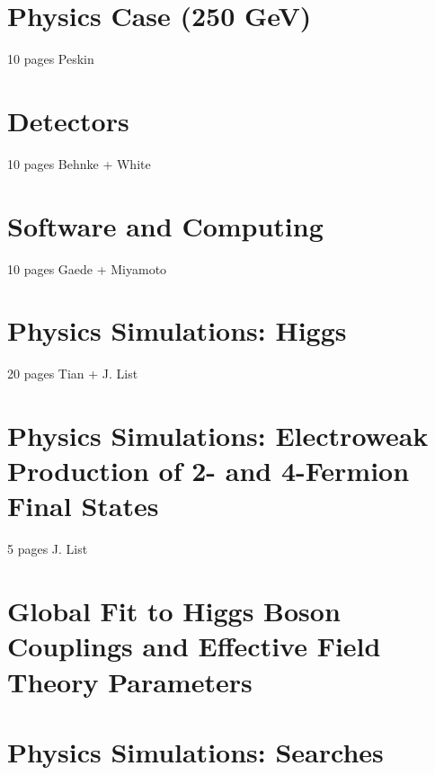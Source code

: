 \documentclass[%
 reprint,
nofootinbib,
 amsmath,amssymb,
 aps,
]{revtex4-1}
\begin{document}

   
   
\section{\label{sec:physics}Physics Case (250 GeV) }

10 pages Peskin
 
%
 
\section{\label{sec:detectors}Detectors }


  10 pages Behnke + White
  


\section{\label{sec:software}Software and Computing}

   10 pages Gaede + Miyamoto
   
   

\section{\label{sec:higgs}Physics Simulations: Higgs
}


  20 pages Tian + J. List
  
%  

\section{\label{sec:ew}Physics Simulations: Electroweak Production of 2- and 4-Fermion Final States }


  5 pages J. List
  
  

\section{\label{sec:global}Global Fit to Higgs Boson Couplings and Effective Field Theory Parameters}

  



\section{\label{sec:searches}Physics Simulations: Searches }
\end{document}
